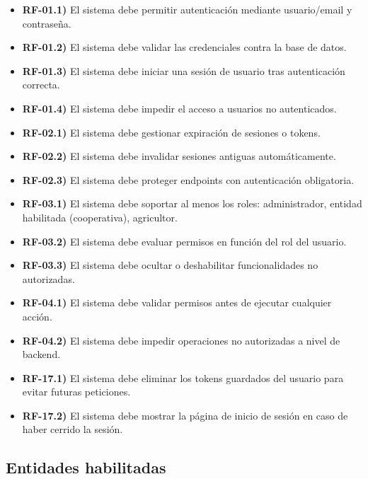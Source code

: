 \begin{itemize}
    \item \textbf{RF-01.1)} El sistema debe permitir autenticación mediante usuario/email y contraseña.
    \item \textbf{RF-01.2)} El sistema debe validar las credenciales contra la base de datos.
    \item \textbf{RF-01.3)} El sistema debe iniciar una sesión de usuario tras autenticación correcta.
    \item \textbf{RF-01.4)} El sistema debe impedir el acceso a usuarios no autenticados.
    \item \textbf{RF-02.1)} El sistema debe gestionar expiración de sesiones o tokens.
    \item \textbf{RF-02.2)} El sistema debe invalidar sesiones antiguas automáticamente.
    \item \textbf{RF-02.3)} El sistema debe proteger endpoints con autenticación obligatoria.
    \item \textbf{RF-03.1)} El sistema debe soportar al menos los roles: administrador, entidad habilitada (cooperativa), agricultor.
    \item \textbf{RF-03.2)} El sistema debe evaluar permisos en función del rol del usuario.
    \item \textbf{RF-03.3)} El sistema debe ocultar o deshabilitar funcionalidades no autorizadas.
    \item \textbf{RF-04.1)} El sistema debe validar permisos antes de ejecutar cualquier acción.
    \item \textbf{RF-04.2)} El sistema debe impedir operaciones no autorizadas a nivel de backend.
    \item \textbf{RF-17.1)} El sistema debe eliminar los tokens guardados del usuario para evitar futuras peticiones.
    \item \textbf{RF-17.2)} El sistema debe mostrar la página de inicio de sesión en caso de haber cerrido la sesión.
\end{itemize}

\subsection{Entidades habilitadas}

